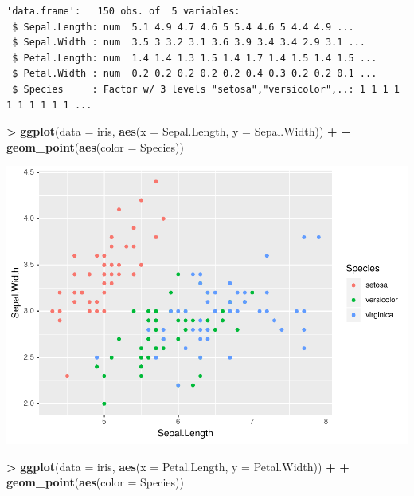 \documentclass[
]{krantz}
\makeatletter
\newenvironment{Shaded}{\begin{snugshade}}{\end{snugshade}}
\newcommand{\DataTypeTok}[1]{\textcolor[rgb]{0.27,0.27,0.27}{#1}}
\newcommand{\KeywordTok}[1]{\textcolor[rgb]{0.27,0.27,0.27}{\textbf{#1}}}
\newcommand{\NormalTok}[1]{#1}
\newcommand{\OperatorTok}[1]{\textcolor[rgb]{0.43,0.43,0.43}{\textbf{#1}}}
\newcommand{\StringTok}[1]{\textcolor[rgb]{0.5,0.5,0.5}{#1}}
\newenvironment{kframe}{%
\medskip{}
\setlength{\fboxsep}{.8em}
 \def\at@end@of@kframe{}%
 \ifinner\ifhmode%
  \def\at@end@of@kframe{\end{minipage}}%
  \begin{minipage}{\columnwidth}%
 \fi\fi%
 \def\FrameCommand##1{\hskip\@totalleftmargin \hskip-\fboxsep
 \colorbox{shadecolor}{##1}\hskip-\fboxsep
     \hskip-\linewidth \hskip-\@totalleftmargin \hskip\columnwidth}%
 \MakeFramed {\advance\hsize-\width
   \@totalleftmargin\z@ \linewidth\hsize
   \@setminipage}}%
 {\par\unskip\endMakeFramed%
 \at@end@of@kframe}
\renewenvironment{Shaded}{\begin{kframe}}{\end{kframe}}
\makeatother
\begin{document}
\begin{verbatim}
'data.frame':   150 obs. of  5 variables:
 $ Sepal.Length: num  5.1 4.9 4.7 4.6 5 5.4 4.6 5 4.4 4.9 ...
 $ Sepal.Width : num  3.5 3 3.2 3.1 3.6 3.9 3.4 3.4 2.9 3.1 ...
 $ Petal.Length: num  1.4 1.4 1.3 1.5 1.4 1.7 1.4 1.5 1.4 1.5 ...
 $ Petal.Width : num  0.2 0.2 0.2 0.2 0.2 0.4 0.3 0.2 0.2 0.1 ...
 $ Species     : Factor w/ 3 levels "setosa","versicolor",..: 1 1 1 1 1 1 1 1 1 1 ...
\end{verbatim}

\begin{Shaded}
\begin{Highlighting}[]
\OperatorTok{\textgreater{}}\StringTok{ }\KeywordTok{ggplot}\NormalTok{(}\DataTypeTok{data =}\NormalTok{ iris, }\KeywordTok{aes}\NormalTok{(}\DataTypeTok{x =}\NormalTok{ Sepal.Length, }\DataTypeTok{y =}\NormalTok{ Sepal.Width)) }\OperatorTok{+}\StringTok{ }
\OperatorTok{+}\StringTok{   }\KeywordTok{geom\_point}\NormalTok{(}\KeywordTok{aes}\NormalTok{(}\DataTypeTok{color =}\NormalTok{ Species))}
\end{Highlighting}
\end{Shaded}

\includegraphics{bookdown_files/figure-latex/unnamed-chunk-246-1.pdf}

\begin{Shaded}
\begin{Highlighting}[]
\OperatorTok{\textgreater{}}\StringTok{ }\KeywordTok{ggplot}\NormalTok{(}\DataTypeTok{data =}\NormalTok{ iris, }\KeywordTok{aes}\NormalTok{(}\DataTypeTok{x =}\NormalTok{ Petal.Length, }\DataTypeTok{y =}\NormalTok{ Petal.Width)) }\OperatorTok{+}\StringTok{ }
\OperatorTok{+}\StringTok{   }\KeywordTok{geom\_point}\NormalTok{(}\KeywordTok{aes}\NormalTok{(}\DataTypeTok{color =}\NormalTok{ Species))}
\end{Highlighting}
\end{Shaded}
\end{document}
